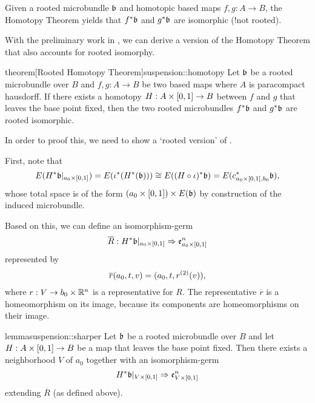 \begin{myparagraph}
    Given a rooted microbundle $\bb$ and homotopic based maps $f, g: A \to B$,
    the Homotopy Theorem yields that $\ind{f}\bb$ and $\ind{g}\bb$ are isomorphic (!not rooted).
    
    With the preliminary work in , we can derive
    a version of the Homotopy Theorem that also accounts for rooted isomorphy.
\end{myparagraph}

\begin{mystatement}{theorem}[Rooted Homotopy Theorem]{suspension::homotopy}
    Let $\bb$ be a rooted microbundle over $B$ and $f, g: A \to B$ be two based maps
    where $A$ is paracompact hausdorff.
    If there exists a homotopy $H: A \times{} [0, 1] \to B$ between $f$ and $g$ that leaves the base point fixed,
    then the two rooted microbundles $\ind{f}\bb$ and $\ind{g}\bb$ are rooted isomorphic.
\end{mystatement}

\begin{myparagraph}
    In order to proof this,
    we need to show a `rooted version' of .
    
    First, note that 
    \[
        E(\ind{H}\bb[\cyl{a_0}]) = E(\ind{\iota}(\ind{H}(\bb)))
        \cong E(\ind{(H \circ \iota)}\bb) = E(\ind{c_{\cyl{a_0}, b_0}}\bb),
    \]
    whose total space is of the form $(a_0 \cross [0, 1]) \cross E(\bb)$
    by construction of the induced microbundle.

    Based on this, we can define an isomorphism-germ
    \[ \germdef{\overline{R}}{\ind{H}\bb[\cyl{a_0}]}{\be{\cyl{a_0}}} \]
    represented by
    \[ \overline{r}(a_0, t, v) = (a_0, t, r^{(2)}(v)), \]
    where $r: V \to b_0 \times \mathbb{R}^n$ is a representative for $R$.
    The representative $\overline{r}$ is a homeomorphism on its image,
    because its components are homeomorphisms on their image. 
\end{myparagraph}

\begin{mystatement}{lemma}{suspension::sharper}
    Let $\bb$ be a rooted microbundle over $B$ and
    let $H: A \times{} [0, 1] \to B$ be a map that leaves the base point fixed.
    Then there exists a neighborhood $V$ of $a_0$ together with an isomorphism-germ
    \[ \germ{\ind{H}\bb[\cyl{V}]}{\be{\cyl{V}}} \]
    extending $\overline{R}$ (as defined above).
\end{mystatement}

